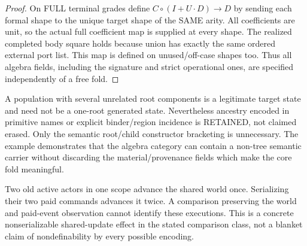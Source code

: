 \documentclass[11pt]{article}
\begin{document}
\begin{proof}
On FULL terminal grades define $C\circ(I+U\cdot D)\to D$ by sending each formal shape to the unique target shape of the SAME arity. All coefficients are unit, so the actual full coefficient map is supplied at every shape. The realized completed body square holds because union has exactly the same ordered external port list. This map is defined on unused/off-case shapes too. Thus all algebra fields, including the signature and strict operational ones, are specified independently of a free fold.\end{proof}

A population with several unrelated root components is a legitimate target state and need not be a one-root generated state. Nevertheless ancestry encoded in primitive names or explicit binder/region incidence is RETAINED, not claimed erased. Only the semantic root/child constructor bracketing is unnecessary. The example demonstrates that the algebra category can contain a non-tree semantic carrier without discarding the material/provenance fields which make the core fold meaningful.

Two old active actors in one scope advance the shared world once. Serializing their two paid commands advances it twice. A comparison preserving the world and paid-event observation cannot identify these executions. This is a concrete nonserializable shared-update effect in the stated comparison class, not a blanket claim of nondefinability by every possible encoding.
\end{document}
